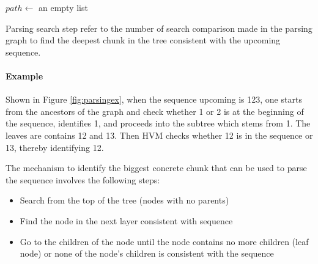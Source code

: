 \documentclass{article} %
\theoremstyle{remark}
\begin{document}
\begin{algorithm}[H]
\SetAlgoLined
{}
$path \leftarrow$ an empty list\;
\caption{Pseudocode for traversing a tree to find a path consistent with an upcoming sequence}
\end{algorithm}\label{code:TreeTraversal}

\begin{definition}
Parsing search step refer to the number of search comparison made in the parsing graph to find the deepest chunk in the tree consistent with the upcoming sequence.
\end{definition}

\paragraph{Example}
Shown in Figure \ref{fig:parsingex}, when the sequence upcoming is 123, one starts from the ancestors of the graph and check whether 1 or 2 is at the beginning of the sequence, identifies 1, and proceeds into the subtree which stems from 1. The leaves are contains 12 and 13. Then HVM checks whether 12 is in the sequence or 13, thereby identifying 12. 

The mechanism to identify the biggest concrete chunk that can be used to parse the sequence involves the following steps:
\begin{itemize}
    \item Search from the top of the tree (nodes with no parents)
    \item Find the node in the next layer consistent with sequence
    \item Go to the children of the node until the node contains no more children (leaf node) or none of the node's children is consistent with the sequence
\end{itemize}
\end{document}
